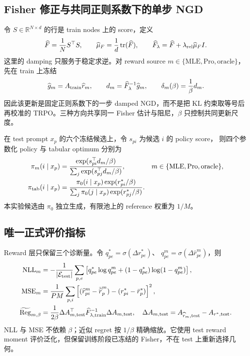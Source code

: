 \documentclass[UTF8,11pt,a4paper,fontset=none]{ctexart}
\newcommand{\R}{\mathbb{R}}
\newcommand{\Reg}{\operatorname{Reg}}
\begin{document}
\subsection{Fisher 修正与共同正则系数下的单步 NGD}

令 $S\in\R^{N\times d}$ 的行是 train nodes 上的 score，定义
\begin{equation}
\widehat F=\frac1N S^\top S,\qquad
\widehat\mu_F=\frac1d\operatorname{tr}(\widehat F),\qquad
\widehat F_\lambda=\widehat F+\lambda_{\rm rel}\widehat\mu_F I.
\label{eq:empirical-fisher}
\end{equation}
这里的 damping 只服务于稳定求逆。对 reward source
$m\in\{\mathrm{MLE},\mathrm{Pro},\mathrm{oracle}\}$，先在 train 上冻结
\begin{equation}
\widehat g_m=A_{\rm train}\widehat r_m,\qquad
d_m=\widehat F_\lambda^{-1}\widehat g_m,\qquad
\delta_m(\beta)=\frac1\beta d_m.
\label{eq:ngd-step}
\end{equation}
因此该更新是固定正则系数下的一步 damped NGD，而不是把 KL 约束取等号后再校准的
TRPO。三种方向共享同一 Fisher 估计与阻尼，$\beta$ 只控制共同更新尺度。

在 test prompt $x_p$ 的六个冻结候选上，令 $s_{pi}$ 为候选 $i$ 的 policy score，
则四个参数化 policy 与 tabular optimum 分别为
\begin{align}
\pi_m(i\mid x_p)
&=\frac{\exp(s_{pi}^{\top}d_m/\beta)}{\sum_j\exp(s_{pj}^{\top}d_m/\beta)},
&&m\in\{\mathrm{MLE},\mathrm{Pro},\mathrm{oracle}\},\\
\pi_{\rm tab}(i\mid x_p)
&=\frac{\pi_0(i\mid x_p)\exp(r^*_{pi}/\beta)}
{\sum_j\pi_0(j\mid x_p)\exp(r^*_{pj}/\beta)}.
\label{eq:candidate-policies}
\end{align}
本实验候选由 $\pi_0$ 独立生成，有限池上的 reference 权重为 $1/M$。

\subsection{唯一正式评价指标}

Reward 层只保留三个诊断量。令 $q^*_{pe}=\sigma(\Delta r^*_{pe})$、
$q^m_{pe}=\sigma(\Delta\widehat r^m_{pe})$，则
\begin{align}
\operatorname{NLL}_m
&=-\frac1{|\mathcal E_{\rm test}|}\sum_{p,e}
\left[q^*_{pe}\log q^m_{pe}+(1-q^*_{pe})\log(1-q^m_{pe})\right],\\
\operatorname{MSE}_m
&=\frac1{PM}\sum_{p,i}
\left[(\widehat r^m_{pi}-\bar{\widehat r}^m_p)-(r^*_{pi}-\bar r^*_p)\right]^2,\\
\widetilde{\Reg}_{m,\beta}
&=\frac1{2\beta}\Delta A_{m,{\rm test}}^\top
\widehat F_{\lambda,{\rm train}}^{-1}\Delta A_{m,{\rm test}},
\quad
\Delta A_{m,{\rm test}}=A_{\widehat r_m,{\rm test}}-A_{r^*,{\rm test}}.
\label{eq:formal-reward-metrics}
\end{align}
NLL 与 MSE 不依赖 $\beta$；近似 regret 按 $1/\beta$ 精确缩放。它使用 test reward
moment 评价泛化，但保留训练阶段已冻结的 Fisher，不在 test 上重新选择几何。
\end{document}
